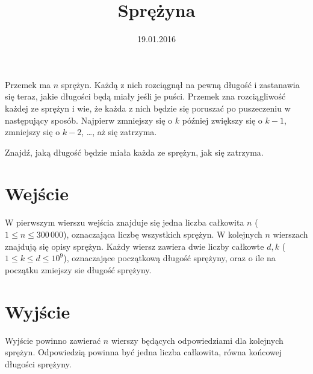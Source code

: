\documentclass[zad,zawodnik,utf8]{sinol}
\title{Sprężyna}
\author{} %
\date{19.01.2016}
\begin{document}
  \begin{tasktext}%

Przemek ma $n$ sprężyn.
Każdą z nich rozciągnął na pewną długość i zastanawia się teraz, jakie długości będą miały jeśli je puści.
Przemek zna rozciągliwość każdej ze sprężyn i wie,
że każda z nich będzie się poruszać po puszeczeniu w następujący sposób.
Najpierw zmniejszy się o $k$ później zwiększy się o $k-1$, zmniejszy się o $k-2$, \ldots, aż się zatrzyma.

Znajdź, jaką długość będzie miała każda ze sprężyn, jak się zatrzyma.

  \section{Wejście}
W pierwszym wierszu wejścia znajduje się jedna liczba całkowita $n$ ($1 \leq n \leq 300\,000$), oznaczająca liczbę wszystkich sprężyn.
W kolejnych $n$ wierszach znajdują się opisy sprężyn. Każdy wiersz zawiera dwie liczby całkowte $d, k$ ($1 \leq k \leq d \leq 10^9$),
oznaczające początkową długość sprężyny, oraz o ile na początku zmiejszy sie długość sprężyny.


  \section{Wyjście}
Wyjście powinno zawierać $n$ wierszy będących odpowiedziami dla kolejnych sprężyn.
Odpowiedzią powinna być jedna liczba całkowita, równa końcowej długości sprężyny.

     \makecompactexample


  \end{tasktext}
\end{document}
